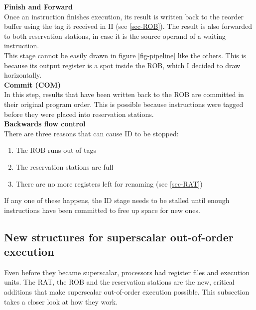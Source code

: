 \documentclass[12pt,a4paper]{article} %
\begin{document}
\textbf{Finish and Forward}\\
Once an instruction finishes execution, its result is written back to the reorder buffer using the tag it received in II (see \ref{sec-ROB}). The result is also forwarded to both reservation stations, in case it is the source operand of a waiting instruction.\\
This stage cannot be easily drawn in figure \ref{fig-pipeline} like the others. This is because its output register is a spot inside the ROB, which I decided to draw horizontally.\\

\newpage
\textbf{Commit (COM)}\\
In this step, results that have been written back to the ROB are committed in their original program order. This is possible because instructions were tagged before they were placed into reservation stations.\\

\textbf{Backwards flow control}\\
There are three reasons that can cause ID to be stopped:
\begin{enumerate}
	\item The ROB runs out of tags
	\item The reservation stations are full
	\item There are no more registers left for renaming (see \ref{sec-RAT})
\end{enumerate}
If any one of these happens, the ID stage needs to be stalled until enough instructions have been committed to free up space for new ones.

\subsection{New structures for superscalar out-of-order execution}
Even before they became superscalar, processors had register files and execution units. The RAT, the ROB and the reservation stations are the new, critical additions that make superscalar out-of-order execution possible. This subsection takes a closer look at how they work.
\end{document}
